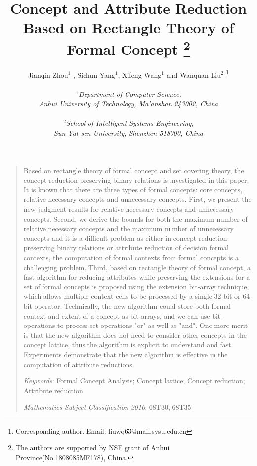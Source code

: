 \documentclass[11pt]{article}
\numberwithin{equation}{subsection}
\begin{document}
\title{\textbf{Concept and Attribute Reduction Based on Rectangle Theory of Formal Concept
\footnote{The
authors are supported by NSF grant of
 Anhui Province(No.1808085MF178), China.} }}
\author{Jianqin Zhou$^{1}$ , Sichun Yang$^{1}$,  Xifeng Wang$^{1}$ and Wanquan Liu$^{2}$ \footnote{Corresponding author.  Email: liuwq63@mail.sysu.edu.cn}\\
\\
\textit{$^{1}$Department of Computer Science,} \\
\textit{Anhui University of   Technology, Ma'anshan 243002,   China}\\
\\
\textit{$^{2}$School of Intelligent Systems Engineering,} \\
\textit{Sun Yat-sen University, Shenzhen 518000,  China}}
\date{ }
\maketitle
\begin{quotation}
\small\noindent

Based on rectangle theory of formal concept and set covering theory, the concept reduction preserving binary
relations is investigated in this paper. It is known that there are three types of formal concepts:  core concepts, relative necessary concepts and
unnecessary concepts. First, we present the new judgment results for relative necessary concepts and
unnecessary concepts. Second, we  derive the bounds for both the maximum number of relative necessary concepts and the maximum number of unnecessary concepts and it is a difficult problem as either in concept reduction preserving binary relations or attribute reduction of decision formal contexts, the computation of formal contexts from formal concepts is a challenging problem. Third, based on rectangle theory of formal concept, a fast algorithm for reducing attributes while preserving the extensions for a set of formal concepts is proposed
using the extension bit-array technique, which allows multiple context cells to be processed by a single 32-bit or 64-bit operator.
Technically, the new algorithm could store both formal context and extent of a concept as bit-arrays, and we can use bit-operations to process set operations "or" as well as "and". One more merit is that the new algorithm does not need to consider other concepts in the concept lattice, thus the algorithm is explicit to understand and fast.  Experiments demonstrate that the new algorithm is effective in the computation of attribute reductions.

\noindent\textit {Keywords}: Formal Concept Analysis; Concept lattice; Concept reduction; Attribute reduction


\noindent \textit{Mathematics Subject Classification 2010}: 68T30,
68T35

\end{quotation}
\end{document}
